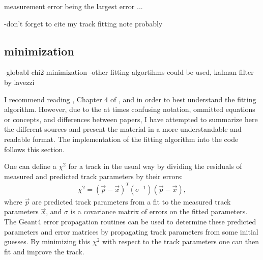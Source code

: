 measurement error being the largest error ... 


-don't forget to cite my track fitting note probably



\subsection{\texorpdfstring{\chisq}{chisq} minimization}


-globabl chi2 minimization
-other fitting algortihms could be used, kalman filter by lavezzi



    I recommend reading \cite{geanemanual}, Chapter 4 of \cite{Lavezzi}, and \cite{trajfit} in order to best understand the fitting algorithm. However, due to the at times confusing notation, ommitted equations or concepts, and differences between papers, I have attempted to summarize here the different sources and present the material in a more understandable and readable format. The implementation of the fitting algorithm into the code follows this section.

    One can define a $\chi^{2}$ for a track in the usual way by dividing the residuals of measured and predicted track parameters by their errors:
        \begin{align} \label{eq:chi2}
            \chi^2 = (\vec{p}-\vec{x})^{T} (\sigma^{-1}) (\vec{p}-\vec{x}),
        \end{align}
    where $\vec{p}$ are predicted track parameters from a fit to the measured track parameters $\vec{x}$, and $\sigma$ is a covariance matrix of errors on the fitted parameters. The Geant4 error propagation routines can be used to determine these predicted parameters and error matrices by propagating track parameters from some initial guesses. By minimizing this $\chi^{2}$ with respect to the track parameters one can then fit and improve the track. 







